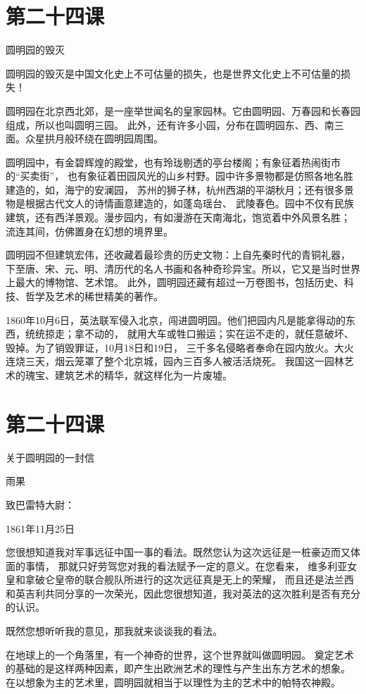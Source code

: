 \documentclass[12pt,UTF8]{ctexbook}
\begin{document}
\section{第二十四课}

圆明园的毁灭

圆明园的毁灭是中国文化史上不可估量的损失，也是世界文化史上不可估量的损失！

圆明园在北京西北郊，是一座举世闻名的皇家园林。它由圆明园、万春园和长春园组成，所以也叫圆明三园。
此外，还有许多小园，分布在圆明园东、西、南三面。众星拱月般环绕在圆明园周围。

圆明园中，有金碧辉煌的殿堂，也有玲珑剔透的亭台楼阁；有象征着热闹街市的“买卖街”，
也有象征着田园风光的山乡村野。园中许多景物都是仿照各地名胜建造的，如，海宁的安澜园，
苏州的狮子林，杭州西湖的平湖秋月；还有很多景物是根据古代文人的诗情画意建造的，如蓬岛瑶台、
武陵春色。园中不仅有民族建筑，还有西洋景观。漫步园内，有如漫游在天南海北，饱览着中外风景名胜；
流连其间，仿佛置身在幻想的境界里。

圆明园不但建筑宏伟，还收藏着最珍贵的历史文物：上自先秦时代的青铜礼器，
下至唐、宋、元、明、清历代的名人书画和各种奇珍异宝。所以，它又是当时世界上最大的博物馆、艺术馆。
此外，圆明园还藏有超过一万卷图书，包括历史、科技、哲学及艺术的稀世精美的著作。

1860年10月6日，英法联军侵入北京，闯进圆明园。他们把园内凡是能拿得动的东西，统统掠走；拿不动的，
就用大车或牲口搬运；实在运不走的，就任意破坏、毁掉。为了销毁罪证，10月18日和19日，
三千多名侵略者奉命在园内放火。大火连烧三天，烟云笼罩了整个北京城，园內三百多人被活活烧死。
我国这一园林艺术的瑰宝、建筑艺术的精华，就这样化为一片废墟。

\section{第二十四课}

关于圆明园的一封信

雨果

致巴雷特大尉：

1861年11月25日

您很想知道我对军事远征中国一事的看法。既然您认为这次远征是一桩豪迈而又体面的事情，
那就只好劳驾您对我的看法赋予一定的意义。在您看来，
维多利亚女皇和拿破仑皇帝的联合舰队所进行的这次远征真是无上的荣耀，
而且还是法兰西和英吉利共同分享的一次荣光，因此您很想知道，我对英法的这次胜利是否有充分的认识。

既然您想听听我的意见，那我就来谈谈我的看法。

在地球上的一个角落里，有一个神奇的世界，这个世界就叫做圆明园。
奠定艺术的基础的是这样两种因素，即产生出欧洲艺术的理性与产生出东方艺术的想象。
在以想象为主的艺术里，圆明园就相当于以理性为主的艺术中的帕特农神殿。
\end{document}
